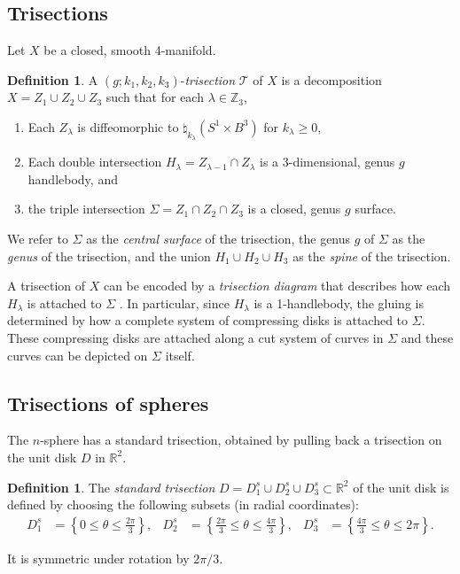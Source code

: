 \documentclass[11pt]{amsart}
\theoremstyle{definition}
\newtheorem{definition}[theorem]{Definition}
\theoremstyle{remark}
\numberwithin{equation}{section}
\newcommand{\ZZ}{\mathbb{Z}}
\newcommand{\cT}{\mathcal{T}}
\newcommand{\RR}{\mathbb{R}}
\begin{document}
\subsection{Trisections}

Let $X$ be a closed, smooth 4-manifold.

\begin{definition}
A $(g;k_1,k_2,k_3)$-{\it trisection} $\cT$ of $X$ is a decomposition $X = Z_1 \cup Z_2 \cup Z_3$ such that for each $\lambda \in \ZZ_3$,
\begin{enumerate}
\item Each $Z_{\lambda}$ is diffeomorphic to $\natural_{k_{\lambda}} (S^1 \times B^3)$ for $k_{\lambda} \geq 0$,
\item Each double intersection $H_{\lambda} = Z_{\lambda-1} \cap Z_{\lambda}$ is a 3-dimensional, genus $g$ handlebody, and
\item the triple intersection $\Sigma = Z_1 \cap Z_2 \cap Z_3$ is a closed, genus $g$ surface.
\end{enumerate}
We refer to $\Sigma$ as the {\it central surface} of the trisection, the genus $g$ of $\Sigma$ as the {\it genus} of the trisection, and the union $H_1 \cup H_2 \cup H_3$ as the {\it spine} of the trisection.
\end{definition}

A trisection of $X$ can be encoded by a {\it trisection diagram} that describes how each $H_{\lambda}$ is attached to $\Sigma$ \cite[Definition 3]{Gay-Kirby}.  In particular, since $H_{\lambda}$ is a 1-handlebody, the gluing is determined by how a complete system of compressing disks is attached to $\Sigma$.  These compressing disks are attached along a cut system of curves in $\Sigma$ and these curves can be depicted on $\Sigma$ itself.

\subsection{Trisections of spheres}

The $n$-sphere has a standard trisection, obtained by pulling back a trisection on the unit disk $D$ in $\mathbb{R}^2$.  

\begin{definition}
The {\it standard trisection} $D = D^s_1 \cup D^s_2 \cup D^s_3 \subset \RR^2$ of the unit disk is defined by choosing the following subsets (in radial coordinates):
\begin{align*}
D^s_1 &= \left\{ 0 \leq \theta \leq \frac{2\pi}{3} \right\}, & D^s_2 &= \left\{\frac{2\pi}{3} \leq \theta \leq \frac{4\pi}{3} \right\}, &  D^s_3 &= \left\{ \frac{4\pi}{3} \leq \theta \leq 2 \pi \right\}.
\end{align*}
\end{definition}
It is symmetric under rotation by $2\pi/3$.
\end{document}
